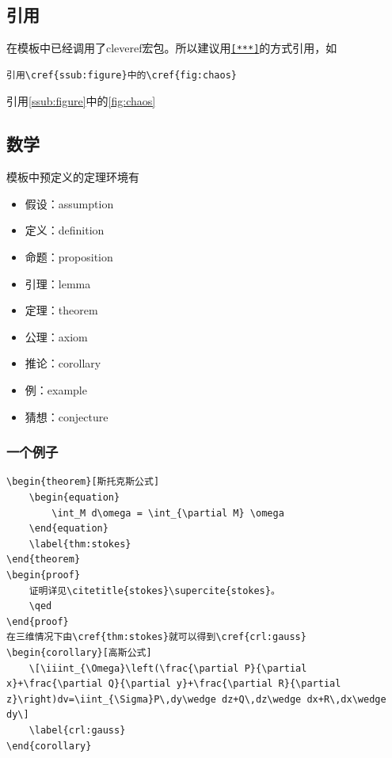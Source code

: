 \documentclass{LZU}
\newcommand{\package}[1]{{\sffamily #1}}
\begin{document}
\subsection{引用}
在模板中已经调用了\package{cleveref}宏包。所以建议用\texttt{\cref{***}}的方式引用，如
\begin{verbatim}
引用\cref{ssub:figure}中的\cref{fig:chaos}
\end{verbatim}
引用\cref{ssub:figure}中的\cref{fig:chaos}
\subsection{数学}
模板中预定义的定理环境有
\begin{itemize}
    \item 假设：assumption
    \item 定义：definition
    \item 命题：proposition
    \item 引理：lemma
    \item 定理：theorem
    \item 公理：axiom
    \item 推论：corollary
    \item 例：example
    \item 猜想：conjecture
\end{itemize}
\subsubsection{一个例子}
\begin{verbatim}
\begin{theorem}[斯托克斯公式]
    \begin{equation}
        \int_M d\omega = \int_{\partial M} \omega
    \end{equation}
    \label{thm:stokes}
\end{theorem}
\begin{proof}
    证明详见\citetitle{stokes}\supercite{stokes}。
    \qed
\end{proof}
在三维情况下由\cref{thm:stokes}就可以得到\cref{crl:gauss}
\begin{corollary}[高斯公式]
    \[\iiint_{\Omega}\left(\frac{\partial P}{\partial x}+\frac{\partial Q}{\partial y}+\frac{\partial R}{\partial z}\right)dv=\iint_{\Sigma}P\,dy\wedge dz+Q\,dz\wedge dx+R\,dx\wedge dy\]
    \label{crl:gauss}
\end{corollary}
\end{verbatim}
\end{document}
